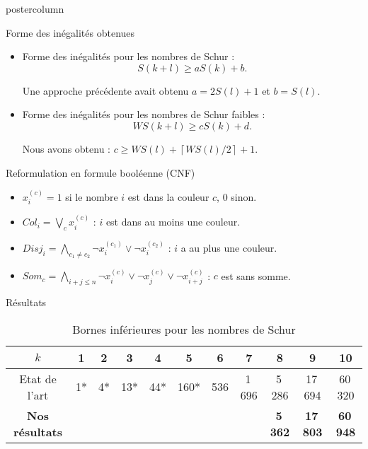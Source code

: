 \documentclass[roundedcorners=true, titleposition=left]{beamerthemeruhuisstijlposter}
\newcommand{\WS}{\mathit{WS}}
\begin{document}
\begin{frame}
\begin{columns}
\begin{column}{0.49\textwidth}
\begin{beamercolorbox}[center, wd=\textwidth]{postercolumn}
\begin{minipage}[T]{0.95\textwidth}
{\begin{block}{Forme des inégalités obtenues}
\begin{itemize}
   \item Forme des inégalités pour les nombres de Schur :
   \[S(k+l) \geqslant aS(k) + b.\]
   
   Une approche précédente avait obtenu $a=2S(l)+1$ et $b=S(l)$.
   \vspace{1ex}
   \item Forme des inégalités pour les nombres de Schur faibles :
   \[ \WS(k+l) \geqslant cS(k) + d.\]
   
   Nous avons obtenu : $c \geqslant \WS (l) + \left \lceil \WS(l)/2 \right \rceil +1$.

     	
  \end{itemize}
  \end{block}

  \medskip
  \begin{block}{Reformulation en formule booléenne (CNF)}
  \begin{itemize}
      \item \(x_i^{(c)} = 1\) si le nombre \(i\) est dans la couleur \(c\), \(0\) sinon.
      \item \(\mathit{Col}_i = \bigvee\limits_{c} x_i^{(c)} \) : \(i\) est dans au moins une couleur.
      \item \(\mathit{Disj}_i = \bigwedge\limits_{c_1 \neq c_2} \neg x_i^{(c_1)} \vee \neg x_i^{(c_2)}\) : \(i\) a au plus une couleur.
      \item \(\mathit{Som}_c = \bigwedge\limits_{i + j \leqslant n} \neg x_i^{(c)} \vee \neg x_j^{(c)} \vee \neg x_{i+j}^{(c)}\) : \(c\) est sans somme.
  \end{itemize}
  \end{block}
  \medskip
  \vspace{-1ex}
\begin{block}{Résultats}
\vspace{-1ex}
\begin{center}
    \begin{table}
		\caption{\large Bornes inférieures pour les nombres de Schur}
        
		 \begin{normalsize}
		  
		\begin{tabular}{|*{11}{c|}}
		    \hline
		    \(k\) & 1 & 2 & 3 & 4 & 5 & 6 & 7 & 8 & 9 & 10 \\
		    \hline
		    Etat de l'art & 1* & 4* & 13* & 44* & 160* & 536 & 1\,696 &5\,286 & 17\,694 & 60\,320 \\
		    \hline
		    \textbf{Nos résultats} & & & & & & & & \textbf{5\,362} & \textbf{17\,803} & \textbf{60\,948} \\
		    \hline
		\end{tabular}
						  

\end{normalsize}
\end{table}
\end{center}
\end{block}}
\end{minipage}
\end{beamercolorbox}
\end{column}
\end{columns}
\end{frame}
\end{document}

